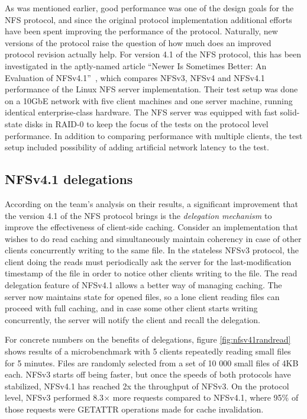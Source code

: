 As was mentioned earlier, good performance was one of the design goals for the NFS protocol,
and since the original protocol implementation additional efforts have been spent improving the performance of the protocol.
Naturally, new versions of the protocol raise the question of how much does an improved protocol revision actually help.
For version 4.1 of the NFS protocol, this has been investigated in the aptly-named article ``Newer Is Sometimes Better: An Evaluation of NFSv4.1''~\cite{NFSv4Better}, which compares NFSv3, NFSv4 and NFSv4.1 performance of the Linux NFS server implementation.
Their test setup was done on a 10GbE network with five client machines and one server machine, running identical enterprise-class hardware.
The NFS server was equipped with fast solid-state disks in RAID-0 to keep the focus of the tests on the protocol level performance.
In addition to comparing performance with multiple clients, the test setup included possibility of adding artificial network latency to the test.

\subsection{NFSv4.1 delegations}
According on the team's analysis on their results, a significant improvement that the version 4.1 of the NFS protocol brings is the \emph{delegation
mechanism} to improve the effectiveness of client-side caching.
Consider an implementation that wishes to do read caching and simultaneously maintain coherency in case of other clients
concurrently writing to the same file.
In the stateless NFSv3 protocol, the client doing the reads must periodically ask the server for the last-modification timestamp of the file in order to notice other clients writing to the file.
The read delegation feature of NFSv4.1 allows a better way of managing caching.
The server now maintains state for opened files, so a lone client reading files can proceed with full caching,
and in case some other client starts writing concurrently, the server will notify the client and recall the delegation.

For concrete numbers on the benefits of delegations,
figure \ref{fig:nfsv41randread} shows results of a microbenchmark with 5 clients repeatedly reading small files for 5 minutes.
Files are randomly selected from a set of 10 000 small files of 4KB each.
NFSv3 starts off being faster, but once the speeds of both protocols have stabilized,
NFSv4.1 has reached 2x the throughput of NFSv3.
On the protocol level, NFSv3 performed 8.3$\times$ more requests compared to NFSv4.1,
where 95\% of those requests were GETATTR operations made for cache invalidation.

